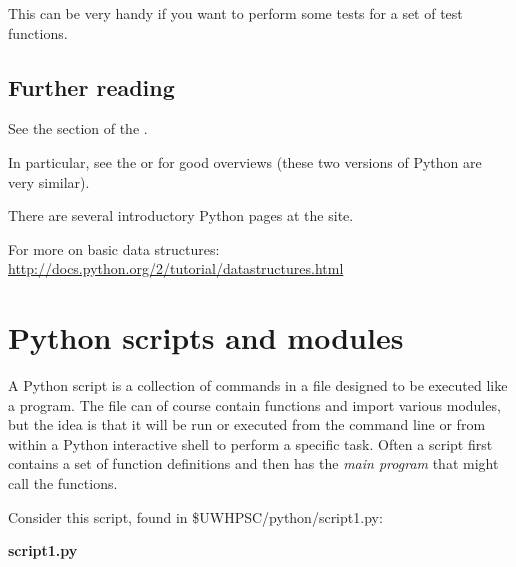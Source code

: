 \documentclass[letterpaper,10pt,english]{sphinxmanual}
\begin{document}
This can be very handy if you want to perform some tests for a set of test
functions.


\subsection{Further reading}
\label{python:further-reading}
See the {\hyperref[biblio:biblio\string-python]{}} section of the {\hyperref[biblio:biblio]{}}.

In particular,
see the \label{python:id7}{\hyperref[biblio:python\string-2\string-5\string-tutorial]{}}  or \label{python:id8}{\hyperref[biblio:python\string-2\string-7\string-tutorial]{}} for good overviews
(these two versions of Python are very similar).

There are several introductory Python pages at the \label{python:id9}{\hyperref[biblio:software\string-carpentry]{}}
site.

For more on basic data structures:
\url{http://docs.python.org/2/tutorial/datastructures.html}


\section{Python scripts and modules}
\label{python_scripts_modules:python-scripts-modules}\label{python_scripts_modules::doc}\label{python_scripts_modules:python-scripts-and-modules}
A Python script is a collection of commands in a file designed to be
executed like a program.  The file can of course contain functions and
import various modules, but the idea is that it will be run or executed
from the command line or from within a Python interactive shell to perform a
specific task.  Often a script first contains a set of function definitions
and then has the \emph{main program} that might call the functions.

Consider this script,  found in \$UWHPSC/python/script1.py:

\textbf{script1.py}
\end{document}
